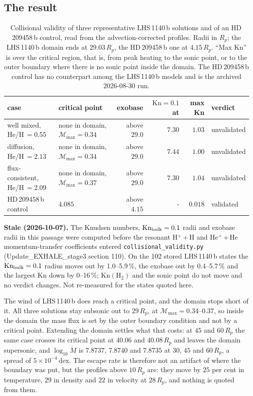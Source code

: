 \documentclass[english,a4paper]{my_memo}
\begin{document}
\subsection{The result}

\begin{table}[htbp]\centering
\caption{Collisional validity of three representative LHS\,1140\,b solutions
and of an HD\,209458\,b control, read from the advection-corrected profiles.
Radii in $R_p$; the LHS\,1140\,b domain ends at $29.03\,R_p$, the
HD\,209458\,b one at $4.15\,R_p$. ``Max Kn'' is over the critical region,
that is, from peak heating to the sonic point, or to the outer boundary where
there is no sonic point inside the domain. The HD\,209458\,b control has no
counterpart among the LHS\,1140\,b models and is the archived 2026-08-30
run.}
\label{tab:validity}
\begin{tabular}{llrrrl}
\toprule
case & critical point & exobase & $\mathrm{Kn} = 0.1$ at & max Kn &
verdict \\
\midrule
well mixed, He/H\,$=0.55$ & none in domain, $\mathcal{M}_{\max} = 0.34$ &
above $29.0$ & $7.30$ & $1.03$ & unvalidated \\
diffusion, He/H\,$=2.13$ & none in domain, $\mathcal{M}_{\max} = 0.34$ &
above $29.0$ & $7.44$ & $1.00$ & unvalidated \\
flux-consistent, He/H\,$=2.09$ & none in domain, $\mathcal{M}_{\max} = 0.37$ &
above $29.0$ & $7.30$ & $1.04$ & unvalidated \\
\midrule
HD\,209458\,b control & $4.085$ & above $4.15$ & - & $\mathbf{0.018}$ &
validated \\
\bottomrule
\end{tabular}
\end{table}

\noindent\textbf{Stale (2026-10-07).} The Knudsen numbers, $\mathrm{Kn}_{\rm bulk}=0.1$ radii and exobase radii in this passage were computed before the resonant H$^+$\,+\,H and He$^+$\,+\,He momentum-transfer coefficients entered \texttt{collisional\_validity.py} (Update\_EXHALE\_stage3 section 110). On the 102 stored LHS\,1140\,b states the $\mathrm{Kn}_{\rm bulk}=0.1$ radius moves out by 1.0--5.9\,\%, the exobase out by 0.4--5.7\,\% and the largest Kn down by 0--16\,\%; $\mathrm{Kn}(\mathrm{H_2})$ and the sonic point do not move and no verdict changes. Not re-measured for the states quoted here.

\noindent The wind of LHS\,1140\,b does reach a critical point, and the
domain stops short of it. All three solutions stay subsonic out to
$29\,R_p$, at $\mathcal{M}_{\max} = 0.34$--$0.37$, so inside the domain the
mass flux is set by the outer boundary condition and not by a critical point.
Extending the domain settles what that costs: at $45$ and $60\,R_p$ the same
case crosses its critical point at $40.06$ and $40.08\,R_p$ and leaves the
domain supersonic, and $\log_{10}\dot M$ is $7.8737$, $7.8740$ and $7.8735$
at $30$, $45$ and $60\,R_p$, a spread of $5\times10^{-4}$\,dex. The escape
rate is therefore not an artifact of where the boundary was put, but the
profiles above $10\,R_p$ are: they move by $25$ per cent in temperature, $29$
in density and $22$ in velocity at $28\,R_p$, and nothing is quoted from
them.
\end{document}
